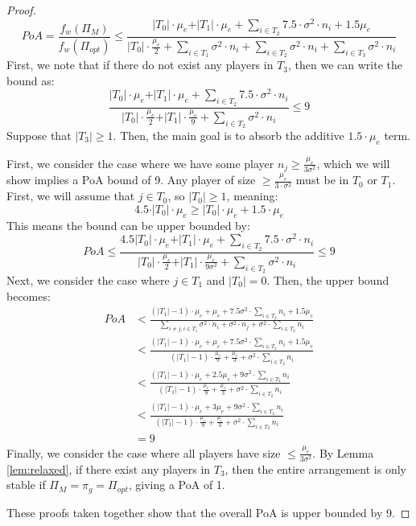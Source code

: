 \documentclass{article}
\newcommand{\cd}[0]{\cdot}
\newcommand{\mue}[0]{\ensuremath{\mu_e}}
\newcommand{\var}[0]{\ensuremath{\sigma^2}}
\newcommand{\ndraw}[0]{\ensuremath{n}}
\newcommand{\gcol}[0]{\ensuremath{\pi_g}}
\newcommand{\costw}[0]{\ensuremath{f_w}}
\newcommand{\partition}[0]{\ensuremath{\Pi}}
\begin{document}
\begin{proof}
$$PoA = \frac{\costw(\partition_{M})}{\costw(\partition_{opt})} \leq \frac{\vert T_0 \vert \cd \mue + \vert T_1 \vert \cd \mue + \sum_{i \in T_2} 7.5 \cd \var \cd \ndraw_i + 1.5 \mue }{\vert T_0 \vert \cd \frac{\mue}{2} + \sum_{i \in T_1} \var \cd \ndraw_i  + \sum_{i \in T_2}  \var \cd \ndraw_i + \sum_{i \in T_3} \var \cd \ndraw_i}$$
First, we note that if there do not exist any players in $T_3$, then we can write the bound as: 
$$\frac{\vert T_0 \vert \cd \mue + \vert T_1 \vert \cd \mue + \sum_{i \in T_2}7.5 \cd  \var \cd \ndraw_i}{\vert T_0 \vert \cd \frac{\mue}{2} + \vert T_1 \vert \cd \frac{\mue}{9}  + \sum_{i \in T_2}  \var \cd \ndraw_i } \leq 9$$
Suppose that $\vert T_3 \vert \geq 1$. Then, the main goal is to absorb the additive $1.5 \cd  \mue $ term.

First, we consider the case where we have some player $\ndraw_j \geq  \frac{\mue}{3\var}$, which we will show implies a PoA bound of 9. Any player of size $\geq \frac{\mue}{3\cd \var}$ must be in $T_0$ or  $T_1$. First, we will assume that $j \in T_0$, so $\vert T_0 \vert \geq 1$, meaning:  
$$4.5 \cd \vert T_0 \vert \cd \mue \geq \vert T_0 \vert \cd \mue + 1.5 \cd \mue $$
This means the bound can be upper bounded by: 
$$PoA \leq  \frac{4.5\vert T_0 \vert \cd \mue + \vert T_1 \vert \cd \mue + \sum_{i \in T_2} 7.5 \cd \var \cd \ndraw_i}{\vert T_0 \vert \cd \frac{\mue}{2} + \vert T_1 \vert \cd \frac{\mue}{9\var}  + \sum_{i \in T_2}  \var \cd \ndraw_i} \leq 9$$
Next, we consider the case where $j \in T_1$ and $\vert T_0 \vert =0$. Then, the upper bound becomes: 
\begin{align*}
PoA&<\frac{(\vert T_1\vert -1)\cd \mue + \mue + 7.5 \var \cd \sum_{i \in T_2} \ndraw_i + 1.5 \mue}{\sum_{i \ne j, i \in T_1} \var \cd \ndraw_i + \var \cd \ndraw_j + \var \cd \sum_{i \in T_2} \ndraw_i}\\
&<\frac{(\vert T_1\vert -1)\cd \mue + \mue + 7.5 \var \cd \sum_{i \in T_2} \ndraw_i + 1.5 \mue}{(\vert T_1 \vert -1)\cd \frac{\mue}{9} + \frac{\mue}{3} + \var \cd \sum_{i \in T_2} \ndraw_i}   \\
&<\frac{(\vert T_1\vert -1)\cd \mue + 2.5\mue + 9 \var \cd \sum_{i \in T_2} \ndraw_i}{(\vert T_1 \vert -1)\cd \frac{\mue}{9} + \frac{\mue}{3} + \var \cd \sum_{i \in T_2} \ndraw_i}\\
&<\frac{(\vert T_1\vert -1)\cd \mue + 3\mue + 9 \var \cd \sum_{i \in T_2} \ndraw_i}{(\vert T_1 \vert -1)\cd \frac{\mue}{9} + \frac{\mue}{3} + \var \cd \sum_{i \in T_2} \ndraw_i} \\
&= 9
\end{align*}
Finally, we consider the case where all players have size $\leq \frac{\mue}{3\var}$. By Lemma \ref{lem:relaxed}, if there exist any players in $T_3$, then the entire arrangement is only stable if $\partition_M = \gcol = \partition_{opt}$, giving a PoA of 1. 

These proofs taken together show that the overall PoA is upper bounded by 9. 
\end{proof}
\end{document}
